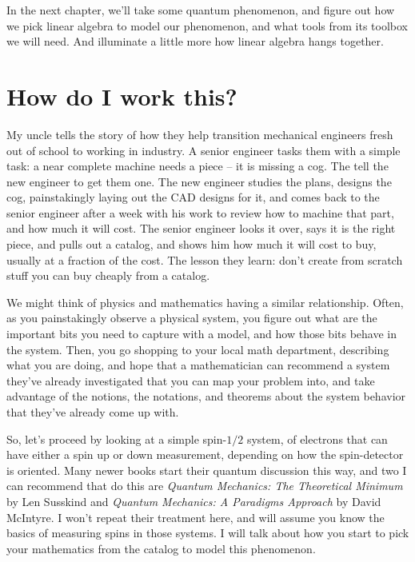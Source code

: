 \documentclass[
]{book}
\begin{document}
In the next chapter, we'll take some quantum phenomenon, and figure out how we pick linear algebra to model our phenomenon, and what tools from its toolbox we will need. And illuminate a little more how linear algebra hangs together.

\hypertarget{how-do-i-work-this}{%
\chapter{How do I work this?}\label{how-do-i-work-this}}

My uncle tells the story of how they help transition mechanical engineers fresh out of school to working in industry. A senior engineer tasks them with a simple task: a near complete machine needs a piece -- it is missing a cog. The tell the new engineer to get them one. The new engineer studies the plans, designs the cog, painstakingly laying out the CAD designs for it, and comes back to the senior engineer after a week with his work to review how to machine that part, and how much it will cost. The senior engineer looks it over, says it is the right piece, and pulls out a catalog, and shows him how much it will cost to buy, usually at a fraction of the cost. The lesson they learn: don't create from scratch stuff you can buy cheaply from a catalog.

We might think of physics and mathematics having a similar relationship. Often, as you painstakingly observe a physical system, you figure out what are the important bits you need to capture with a model, and how those bits behave in the system. Then, you go shopping to your local math department, describing what you are doing, and hope that a mathematician can recommend a system they've already investigated that you can map your problem into, and take advantage of the notions, the notations, and theorems about the system behavior that they've already come up with.

So, let's proceed by looking at a simple spin-\(1/2\) system, of electrons that can have either a spin up or down measurement, depending on how the spin-detector is oriented. Many newer books start their quantum discussion this way, and two I can recommend that do this are \emph{Quantum Mechanics: The Theoretical Minimum} by Len Susskind and \emph{Quantum Mechanics: A Paradigms Approach} by David McIntyre. I won't repeat their treatment here, and will assume you know the basics of measuring spins in those systems. I will talk about how you start to pick your mathematics from the catalog to model this phenomenon.
\end{document}
